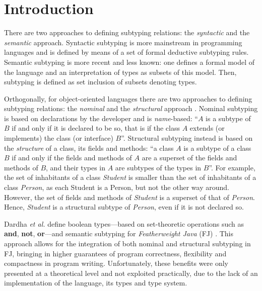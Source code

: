 \documentclass[runningheads]{llncs}
\begin{document}
\section{Introduction}
\label{sec:intro}
There are two approaches to defining subtyping relations: the \emph{syntactic} and the \emph{semantic} approach.
Syntactic subtyping \cite{Liskov1994} is more mainstream in programming languages and is defined by means of a set of formal deductive subtyping rules.
Semantic subtyping \cite{Aiken,Damm} is more recent and less known:  one defines a formal model of the language and an interpretation of types as subsets of this model.
Then, subtyping is defined as set inclusion of subsets denoting types.

Orthogonally, for object-oriented languages there are two approaches to defining subtyping relations: the \emph{nominal} and the \emph{structural} approach \cite{Integrating,Useful}.
Nominal subtyping is based on {declarations} by the developer and is \emph{name}-based: ``$A$ is a subtype of $B$ if and only if it is declared to be so, that is if the class $A$ extends (or implements) the class (or interface) $B$''.
Structural subtyping instead is based on the \emph{structure} of a class, its fields and methods: ``a class $A$ is a subtype of a class $B$ if and only if the fields and methods of $A$ are a superset of the fields and methods of $B$, and their types in $A$ are subtypes of the types in $B$''.
For example, the set of inhabitants of a class \emph{Student} is smaller than the set of inhabitants of a class \emph{Person}, as each Student is a Person, but not the other way around.
However, the set of fields and methods of \emph{Student} is a superset of that of \emph{Person}.
Hence, \emph{Student} is a structural subtype of \emph{Person}, even if it is not declared so.


Dardha \emph{et al.} \cite{Dardha2013,Dardha2017} define boolean types---based on set-theoretic operations such as \textbf{and}, \textbf{not}, \textbf{or}---and semantic subtyping for \emph{Featherweight Java} (FJ) \cite{featherweight}.
This approach allows for the integration of both nominal and structural subtyping in FJ, bringing in higher guarantees of program correctness, flexibility and compactness in program writing.
Unfortunately, these benefits were only presented at a theoretical level and not exploited practically, due to the lack of an implementation of the language, its types and type system.
\end{document}
